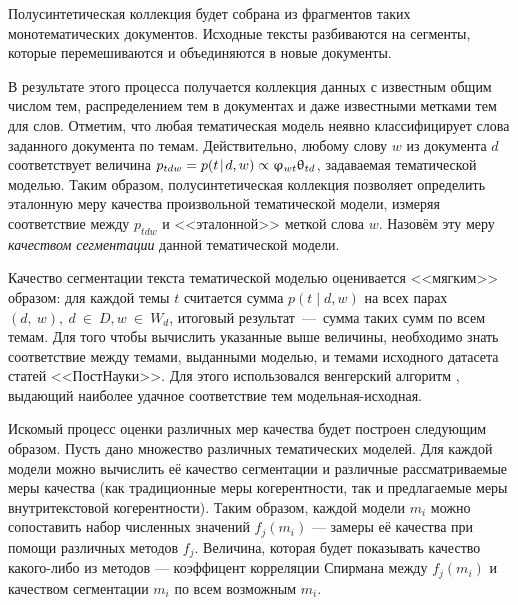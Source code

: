 Полусинтетическая коллекция будет собрана из фрагментов таких монотематических документов. Исходные тексты разбиваются на сегменты, которые перемешиваются и объединяются в новые документы.


В результате этого процесса получается коллекция данных с известным общим числом тем, распределением тем в документах и даже известными метками тем для слов. Отметим, что любая тематическая модель неявно классифицирует слова заданного документа по темам. Действительно, любому слову $w$ из документа $d$ соответствует величина $p_{tdw} = p(t \mspace{2mu}{|}\mspace{2mu} d, w) \propto \upvarphi_{wt}\uptheta_{td}$, задаваемая тематической моделью. Таким образом, полусинтетическая коллекция позволяет определить эталонную меру качества произвольной тематической модели, измеряя соответствие между $p_{tdw}$ и <<эталонной>> меткой слова $w$. Назовём эту меру \textit{качеством сегментации} данной тематической модели.

Качество сегментации текста тематической моделью оценивается <<мягким>> образом: для каждой темы $t$ считается сумма $p(t \mid d, w)$ на всех парах $(d,~w),\ d~\in~D, w~\in~W_d$, итоговый результат~---~сумма таких сумм по всем темам. Для того чтобы вычислить указанные выше величины, необходимо знать соответствие между темами, выданными моделью, и темами исходного датасета статей <<ПостНауки>>. Для этого использовался венгерский алгоритм \cite{kuhn1955hungarian}, выдающий наиболее удачное соответствие тем модельная-исходная.

Искомый процесс оценки различных мер качества будет построен следующим образом. Пусть дано множество различных тематических моделей. Для каждой модели можно вычислить её качество сегментации и различные рассматриваемые меры качества (как традиционные меры когерентности, так и предлагаемые меры внутритекстовой когерентности). Таким образом, каждой модели $m_i$ можно сопоставить набор численных значений $f_j(m_i)$ --- замеры её качества при помощи различных методов $f_j$. Величина, которая будет показывать качество какого-либо из методов --- коэффицент корреляции Спирмана между $f_j(m_i)$ и качеством сегментации $m_i$ по всем возможным $m_i$.

